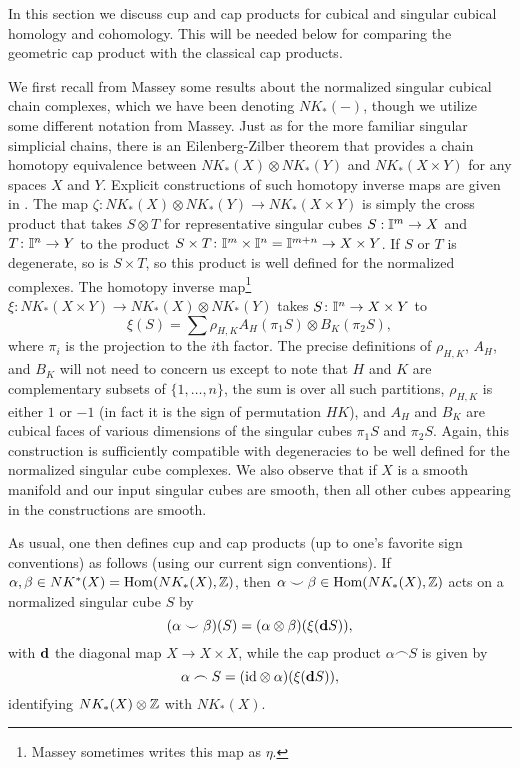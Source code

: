In this section we discuss cup and cap products for cubical and singular cubical homology and cohomology. This will be needed below for comparing the geometric cap product with the classical cap products.

We first recall from Massey \cite[Chapter XI]{Mas91} some results about the normalized singular cubical chain complexes, which we have been denoting $NK_*(-)$, though we utilize some different notation from Massey. Just as for the more familiar singular simplicial chains, there is an Eilenberg-Zilber theorem that provides a chain homotopy equivalence between $NK_*(X) \otimes NK_*(Y)$ and $NK_*(X \times Y)$ for any spaces $X$ and $Y$. Explicit constructions of such homotopy inverse maps are given in \cite[Section XI.5]{Mas91}.
The map $\zeta: NK_*(X) \otimes NK_*(Y) \to NK_*(X \times Y)$ is simply the cross product that takes $S \otimes T$ for representative singular cubes $S: \mathbb{I}^m \to X$ and $T \colon \mathbb{I}^n \to Y$ to the product $S \times T \colon \mathbb{I}^m \times \mathbb{I}^n = \mathbb{I}^{m+n} \to X \times Y$. If $S$ or $T$ is degenerate, so is $S \times T$, so this product is well defined for the normalized complexes. The homotopy inverse map\footnote{Massey sometimes writes this map as $\eta$.} $\xi: NK_*(X \times Y) \to NK_*(X) \otimes NK_*(Y)$ takes $S \colon \mathbb{I}^n \to X \times Y$ to
$$\xi(S) = \sum \rho_{H,K}A_H(\pi_1S) \otimes B_K(\pi_2S),$$ where $\pi_i$ is the projection to the $i$th factor. The precise definitions of $\rho_{H,K}$, $A_H$, and $B_K$ will not need to concern us except to note that $H$ and $K$ are complementary subsets of $\{1,\ldots, n\}$, the sum is over all such partitions, $\rho_{H,K}$ is either $1$ or $-1$ (in fact it is the sign of permutation $HK$), and $A_H$ and $B_K$ are cubical faces of various dimensions of the singular cubes $\pi_1S$ and $\pi_2S$. Again, this construction is sufficiently compatible with degeneracies to be well defined for the normalized singular cube complexes. We also observe that if $X$ is a smooth manifold and our input singular cubes are smooth, then all other cubes appearing in the constructions are smooth.

As usual, one then defines cup and cap products (up to one's favorite sign conventions) as follows (using our current sign conventions). If $\alpha, \beta \in NK^*(X) = \textup{Hom}(NK_*(X),\mathbb{Z})$, then $\alpha\smile \beta \in \textup{Hom}(NK_*(X),\mathbb{Z})$ acts on a normalized singular cube $S$ by
\begin{equation}\label{E: cubical cup}
(\alpha \smile \beta)(S) = (\alpha \otimes \beta)(\xi(\mathbf{d} S)),
\end{equation}
with $\mathbf{d}$ the diagonal map $X \to X \times X$,
while the cap product $\alpha\frown S$ is given by
\begin{equation}\label{E: cubical cap}
\alpha\frown S = (\mathrm{id} \otimes \alpha) (\xi(\mathbf{d} S)),
\end{equation}
identifying $NK_*(X) \otimes \mathbb{Z}$ with $NK_*(X)$.



